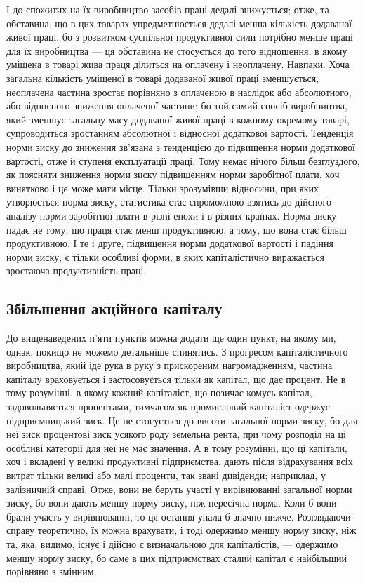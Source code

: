 \parcont{}  %
І до спожитих на їх виробництво засобів праці дедалі знижується; отже, та обставина, що в цих
товарах упредметнюється дедалі менша кількість додаваної живої праці, бо з розвитком суспільної
продуктивної сили потрібно менше праці для їх виробництва — ця обставина не стосується до того
відношення, в якому уміщена в товарі жива праця ділиться на оплачену і неоплачену. Навпаки. Хоча
загальна кількість уміщеної в товарі додаваної живої праці зменшується, неоплачена частина зростає
порівняно з оплаченою в наслідок або абсолютного, або відносного зниження оплаченої частини; бо той
самий спосіб виробництва, який зменшує загальну масу додаваної живої праці в кожному окремому
товарі, супроводиться зростанням абсолютної і відносної додаткової вартості. Тенденція норми зиску
до зниження зв’язана з тенденцією до підвищення норми додаткової вартості, отже й ступеня
експлуатації праці. Тому немає нічого більш безглуздого, як поясняти зниження норми зиску
підвищенням норми заробітної плати, хоч винятково і це може мати місце. Тільки зрозумівши відносини,
при яких утворюється норма зиску, статистика стає спроможною взятись до дійсного аналізу норми
заробітної плати в різні епохи і в різних країнах. Норма зиску падає не тому, що праця стає менш
продуктивною, а тому, що вона стає більш продуктивною. І те і друге, підвищення норми додаткової
вартості і падіння норми зиску, є тільки особливі форми, в яких капіталістично виражається зростаюча
продуктивність праці.

\subsection{Збільшення акційного капіталу}

До вищенаведених п’яти пунктів можна додати ще один пункт, на якому ми, однак, покищо не можемо
детальніше спинятись. З прогресом капіталістичного виробництва, який іде рука в руку з прискореним
нагромадженням, частина капіталу враховується і застосовується тільки як капітал, що дає процент. Не
в тому розумінні, в якому кожний капіталіст, що позичає комусь капітал, задовольняється процентами,
тимчасом як промисловий капіталіст одержує підприємницький зиск. Це не стосується до висоти
загальної норми зиску, бо для неї зиск \deq{} процентові \dplus{} зиск усякого роду \dplus{} земельна рента, при чому
розподіл на ці особливі категорії для неї не має значення. А в тому
розумінні, що ці капітали, хоч і вкладені у великі продуктивні підприємства, дають після
відрахування всіх витрат тільки великі або малі проценти, так звані дивіденди; наприклад, у
залізничній справі. Отже, вони не беруть участі у вирівнюванні загальної норми зиску, бо вони дають
меншу норму зиску, ніж пересічна норма. Коли б вони брали участь у вирівнюванні, то ця остання упала
б значно нижче. Розглядаючи справу теоретично, їх можна врахувати, і тоді одержимо меншу норму
зиску, ніж та, яка, видимо, існує і дійсно є визначальною для капіталістів, — одержимо меншу норму
зиску, бо саме в цих підприємствах сталий капітал є найбільший порівняно з змінним.
